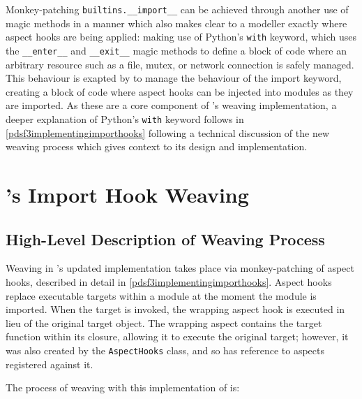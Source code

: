 Monkey-patching \lstinline{builtins.__import__} can be achieved through another
use of magic methods in a manner which also makes clear to a modeller exactly
where aspect hooks are being applied: making use of Python's \lstinline{with}
keyword, which uses the \lstinline{__enter__} and \lstinline{__exit__} magic
methods to define a block of code where an arbitrary resource such as a file,
mutex, or network connection is safely managed. This behaviour is exapted by
\pdsf{} to manage the behaviour of the import keyword, creating a block of code
where aspect hooks can be injected into modules as they are imported. As these
are a core component of \pdsf{}'s weaving implementation, a deeper explanation of
Python's \lstinline{with} keyword follows in \cref{pdsf3implementingimporthooks}
following a technical discussion of the new weaving process which gives context
to its design and implementation.



\section{\pdsf{}'s Import Hook Weaving}\label{sec:import_hooks}



\subsection{High-Level Description of Weaving Process}\label{subsec:pdsf3_weaving_process}

Weaving in \pdsf{}'s updated implementation takes place via monkey-patching of
aspect hooks, described in detail in \cref{pdsf3implementingimporthooks}. Aspect hooks
replace executable targets within a module at the moment the module is imported.
When the target is invoked, the wrapping aspect hook is executed in lieu of the
original target object. The wrapping aspect contains the target function within
its closure, allowing it to execute the original target; however, it was also
created by the \lstinline{AspectHooks} class, and so has reference to aspects
registered against it. 

The process of weaving with this implementation of \pdsf is:


